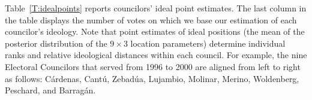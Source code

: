 \documentclass[12 pt, letter]{article}
\begin{document}


Table~\ref{T:idealpoints} reports councilors' ideal point estimates. The last column in the table displays the number of votes on which we base our estimation of each councilor's ideology. Note that point estimates of ideal positions (the mean of the posterior distribution of the $9 \times 3$ location parameters) determine individual ranks and relative ideological distances within each council.  For example, the nine Electoral Councilors that served from 1996 to 2000 are aligned from left to right as follows: C\'ardenas, Cant\'u, Zebad\'ua, Lujambio, Molinar, Merino, Woldenberg, Peschard, and Barrag\'an.
\end{document}
